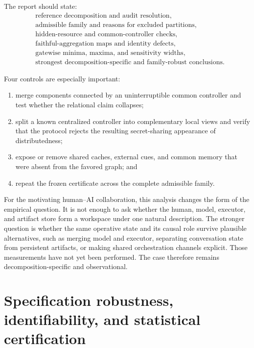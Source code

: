 The report should state:
\[
\begin{aligned}
&\text{reference decomposition and audit resolution},\\
&\text{admissible family and reasons for excluded partitions},\\
&\text{hidden-resource and common-controller checks},\\
&\text{faithful-aggregation maps and identity defects},\\
&\text{gatewise minima, maxima, and sensitivity widths},\\
&\text{strongest decomposition-specific and family-robust conclusions}.
\end{aligned}
\]

Four controls are especially important:
\begin{enumerate}
\item merge components connected by an uninterruptible common controller and
 test whether the relational claim collapses;
\item split a known centralized controller into complementary local views and
 verify that the protocol rejects the resulting secret-sharing appearance of
 distributedness;
\item expose or remove shared caches, external cues, and common memory that
 were absent from the favored graph; and
\item repeat the frozen certificate across the complete admissible family.
\end{enumerate}

For the motivating human--AI collaboration, this analysis changes the form of
the empirical question. It is not enough to ask whether the human, model,
executor, and artifact store form a workspace under one natural description.
The stronger question is whether the same operative state and its causal role
survive plausible alternatives, such as merging model and executor, separating
conversation state from persistent artifacts, or making shared orchestration
channels explicit. Those measurements have not yet been performed. The case
therefore remains decomposition-specific and observational.


\chapter{Specification robustness, identifiability, and statistical certification}\label{SRWT:book:chapter-84}


